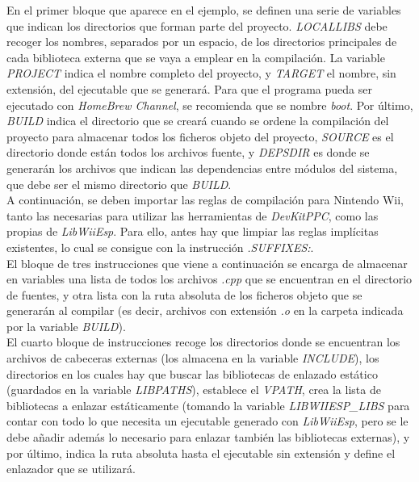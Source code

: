 

En el primer bloque que aparece en el ejemplo, se definen una serie de variables que indican los directorios que forman parte del proyecto. \emph{LOCALLIBS} debe recoger los nombres, separados por un espacio, de los directorios principales de cada biblioteca externa que se vaya a emplear en la compilación. La variable \emph{PROJECT} indica el nombre completo del proyecto, y \emph{TARGET} el nombre, sin extensión, del ejecutable que se generará. Para que el programa pueda ser ejecutado con \emph{HomeBrew Channel}, se recomienda que se nombre \emph{boot}. Por último, \emph{BUILD} indica el directorio que se creará cuando se ordene la compilación del proyecto para almacenar todos los ficheros objeto del proyecto, \emph{SOURCE} es el directorio donde están todos los archivos fuente, y \emph{DEPSDIR} es donde se generarán los archivos que indican las dependencias entre módulos del sistema, que debe ser el mismo directorio que \emph{BUILD}. \\

A continuación, se deben importar las reglas de compilación para Nintendo Wii, tanto las necesarias para utilizar las herramientas de \emph{DevKitPPC}, como las propias de \emph{LibWiiEsp}. Para ello, antes hay que limpiar las reglas implícitas existentes, lo cual se consigue con la instrucción \emph{.SUFFIXES:}. \\

El bloque de tres instrucciones que viene a continuación se encarga de almacenar en variables una lista de todos los archivos \emph{.cpp} que se encuentran en el directorio de fuentes, y otra lista con la ruta absoluta de los ficheros objeto que se generarán al compilar (es decir, archivos con extensión \emph{.o} en la carpeta indicada por la variable \emph{BUILD}). \\

El cuarto bloque de instrucciones recoge los directorios donde se encuentran los archivos de cabeceras externas (los almacena en la variable \emph{INCLUDE}), los directorios en los cuales hay que buscar las bibliotecas de enlazado estático (guardados en la variable \emph{LIBPATHS}), establece el \emph{VPATH}, crea la lista de bibliotecas a enlazar estáticamente (tomando la variable \emph{LIBWIIESP\_LIBS} para contar con todo lo que necesita un ejecutable generado con \emph{LibWiiEsp}, pero se le debe añadir además lo necesario para enlazar también las bibliotecas externas), y por último, indica la ruta absoluta hasta el ejecutable sin extensión y define el enlazador que se utilizará. \\

